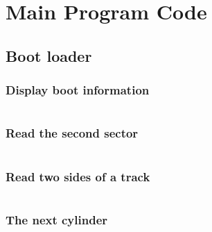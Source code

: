 \documentclass{swfcthesis}
\begin{document}

\appendix{}
\maketailpages{} %


\chapter{Main Program Code} %

\section{Boot loader}

\subsection{Display boot information}
\label{sec:dis-boo-inf}

\inputminted[firstline=55, lastline=65,
linenos=true]{nasm}{../../src/kernel/ipl10.asm}

\subsection{Read the second sector}
\label{sec:rea-sec-sec}
  
\inputminted[firstline=87,lastline=106,linenos=true]{nasm}{../../src/kernel/ipl10.asm}

\subsection{Read two sides of a track}
\label{sec:rea-two-sid}

\inputminted[firstline=108,lastline=132,linenos=true]{nasm}{../../src/kernel/ipl10.asm}

\subsection{The next cylinder}
\label{sec:the-nex-cyl}

\inputminted[firstline=134,lastline=137,linenos=true]{nasm}{../../src/kernel/ipl10.asm}
\end{document}
